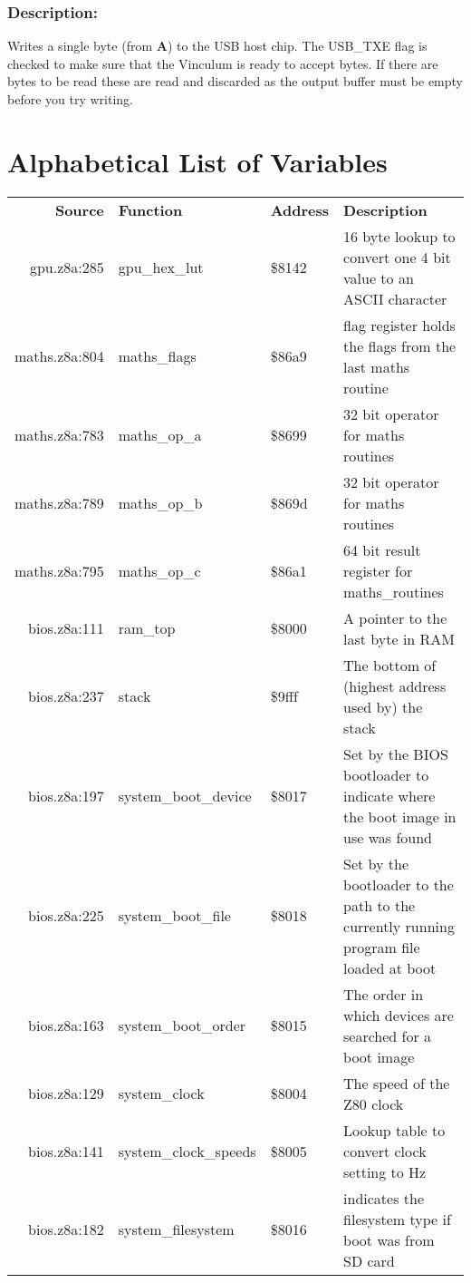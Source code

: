 \subsubsection{Description:}
 Writes a single byte (from \textbf{A}) to the USB host chip.  The USB\_TXE flag is checked to make sure that the Vinculum is ready to accept bytes.  If there are bytes to be read these are read and discarded as the output buffer must be empty before you try writing.

\section{Alphabetical List  of Variables}
\begin{tabular}{rllp{7cm}}
 \textbf{Source}&\textbf{Function}&\textbf{Address}&\textbf{Description}\\
 gpu.z8a:285&gpu\_hex\_lut&\$8142&16 byte lookup to convert one 4 bit value to an ASCII character\\
 maths.z8a:804&maths\_flags&\$86a9&flag register holds the flags from the last maths routine\\
 maths.z8a:783&maths\_op\_a&\$8699&32 bit operator for maths routines\\
 maths.z8a:789&maths\_op\_b&\$869d&32 bit operator for maths routines\\
 maths.z8a:795&maths\_op\_c&\$86a1&64 bit result register for maths\_routines\\
 bios.z8a:111&ram\_top&\$8000&A pointer to the last byte in RAM\\
 bios.z8a:237&stack&\$9fff&The bottom of (highest address used by) the stack\\
 bios.z8a:197&system\_boot\_device&\$8017&Set by the BIOS bootloader to indicate where the boot image in use was found\\
 bios.z8a:225&system\_boot\_file&\$8018&Set by the bootloader to the path to the currently running program file loaded at boot\\
 bios.z8a:163&system\_boot\_order&\$8015&The order in which devices are searched for a boot image\\
 bios.z8a:129&system\_clock&\$8004&The speed of the Z80 clock\\
 bios.z8a:141&system\_clock\_speeds&\$8005&Lookup table to convert clock setting to Hz\\
 bios.z8a:182&system\_filesystem&\$8016&indicates the filesystem type if boot was from SD card\\
\end{tabular}

